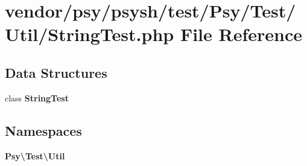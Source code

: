 \section{vendor/psy/psysh/test/\+Psy/\+Test/\+Util/\+String\+Test.php File Reference}
\label{psy_2psysh_2test_2_psy_2_test_2_util_2_string_test_8php}
\subsection*{Data Structures}
\begin{DoxyCompactItemize}
\item 
class {\bf String\+Test}
\end{DoxyCompactItemize}
\subsection*{Namespaces}
\begin{DoxyCompactItemize}
\item 
 {\bf Psy\textbackslash{}\+Test\textbackslash{}\+Util}
\end{DoxyCompactItemize}
